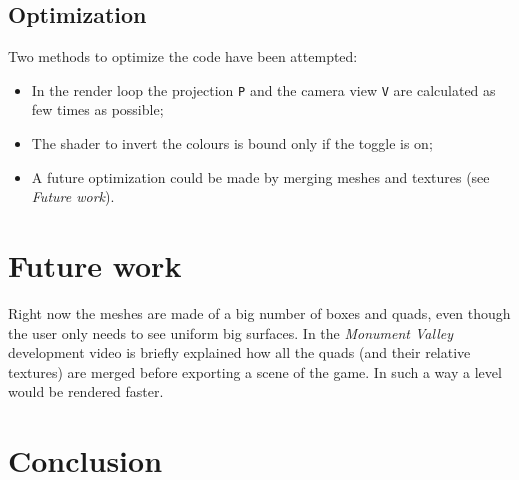 \documentclass[10pt, a4paper]{article}
\begin{document}
\subsection{Optimization}
Two methods to optimize the code have been attempted:
\begin{itemize}
	\item In the render loop the projection \texttt{P} and the camera view \texttt{V} are calculated as few times as possible;
	\item The shader to invert the colours is bound only if the toggle is on;
	\item A future optimization could be made by merging meshes and textures (see \textit{Future work}).
\end{itemize}

\section{Future work}
Right now the meshes are made of a big number of boxes and quads, even though the user only needs to see uniform big surfaces. In the \textit{Monument Valley} development video \cite{Video1} is briefly explained how all the quads (and their relative textures) are merged before exporting a scene of the game. In such a way a level would be rendered faster.
	
\section{Conclusion}

	


		
\end{document}
